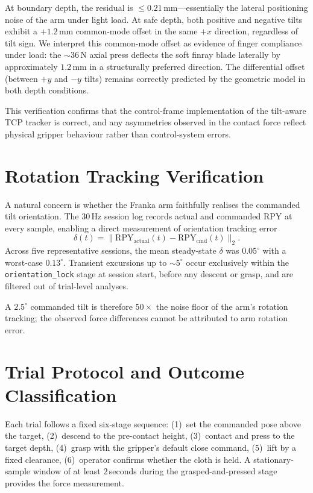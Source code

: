 At boundary depth, the residual is $\leq 0.21$\,mm---essentially the
lateral positioning noise of the arm under light load. At safe depth,
both positive and negative tilts exhibit a $+1.2$\,mm common-mode
offset in the same $+x$ direction, regardless of tilt sign. We
interpret this common-mode offset as evidence of finger compliance
under load: the $\sim 36$\,N axial press deflects the soft finray blade
laterally by approximately $1.2$\,mm in a structurally preferred
direction. The differential offset (between $+y$ and $-y$ tilts)
remains correctly predicted by the geometric model in both depth
conditions.

This verification confirms that the control-frame implementation of the
tilt-aware TCP tracker is correct, and any asymmetries observed in the
contact force reflect physical gripper behaviour rather than
control-system errors.

\section{Rotation Tracking Verification}
\label{sec:rotation-verify}

A natural concern is whether the Franka arm faithfully realises the
commanded tilt orientation. The 30\,Hz session log records actual and
commanded RPY at every sample, enabling a direct measurement of
orientation tracking error
\begin{equation}
  \delta(t) = \| \mathrm{RPY}_{\text{actual}}(t) -
                 \mathrm{RPY}_{\text{cmd}}(t) \|_2.
\end{equation}
Across five representative sessions, the mean steady-state $\delta$
was $0.05^{\circ}$ with a worst-case $0.13^{\circ}$. Transient
excursions up to $\sim 5^{\circ}$ occur exclusively within the
\texttt{orientation\_lock} stage at session start, before any descent
or grasp, and are filtered out of trial-level analyses.

A $2.5^{\circ}$ commanded tilt is therefore $50\times$ the noise floor
of the arm's rotation tracking; the observed force differences cannot
be attributed to arm rotation error.

\section{Trial Protocol and Outcome Classification}
\label{sec:trial-protocol}

Each trial follows a fixed six-stage sequence: (1)~set the commanded
pose above the target, (2)~descend to the pre-contact height,
(3)~contact and press to the target depth, (4)~grasp with the gripper's
default close command, (5)~lift by a fixed clearance, (6)~operator
confirms whether the cloth is held. A stationary-sample window of at
least $2$\,seconds during the grasped-and-pressed stage provides the
force measurement.

